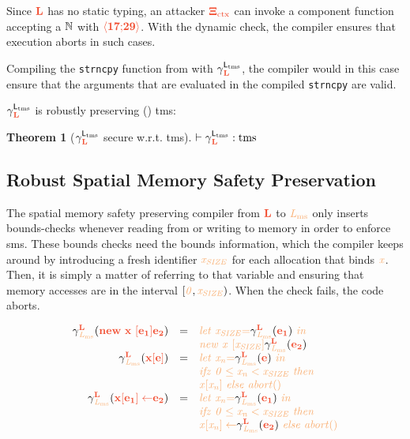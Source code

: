 \documentclass[acmsmall]{acmart}
\theoremstyle{definition}
\newtheorem{theorem}{Theorem}[section]
\begin{document}
\noindent Since $\trg{L}$ has no static typing, an attacker $\trg{\library_{\ctx}}$ can invoke a component function accepting a $\mathsf{\mathbb{N}}$ with $\trg{\lpair{17}{29}}$.
With the dynamic check, the compiler ensures that execution aborts in such cases.

Compiling the \texttt{strncpy} function from  with $\cca$, the compiler would in this case ensure that the arguments that are evaluated in the compiled \texttt{strncpy} are valid.

$\cca$ is robustly preserving () \gls*{tms}:
\begin{theorem}[$\cca$ secure w.r.t. \gls*{tms}]\label{thm:cca:rtp:tms}
    $\rtp{\cca}{\tmssafe}$ %
\end{theorem}

\subsection{Robust Spatial Memory Safety Preservation}\label{subsec:cs:ms}

The spatial memory safety preserving compiler from $\Ltrg$ to $\Lms$ only inserts bounds-checks whenever reading from or writing to memory in order to enforce \gls*{sms}.
These bounds checks need the bounds information, which the compiler keeps around by introducing a fresh identifier $\irl{x_{SIZE}}$ for each allocation that binds $\irl{x}$.
Then, it is simply a matter of referring to that variable and ensuring that memory accesses are in the interval $[\irl{0},\irl{x_{SIZE}})$.
When the check fails, the code aborts.

\begin{nscenter}
  $$
  \begin{array}{rcl}
    \ccb(\trg{\lnew{x}{\expr[_{1}]}{\expr[_{2}]}}) & = 
                                                   & \llet[\irl]{\irl{x_{SIZE}}}{\ccb(\trg{\expr[_{1}]})}{}
    		\\&&
    		\lnew[\irl]{\irl{x}}{\irl{x_{SIZE}}}{\ccb(\trg{\expr[_{2}]})}
    		 \\
  \ccb(\trg{\lget{x}{\expr}}) & = 
                              & \llet[\irl]{\irl{x_{n}}}{\ccb(\trg{\expr})}{}
  	\\&&
  \lifz[\irl]{\irl{0\le x_{n}<x_{SIZE}}}{\\&&\irl{\lget{x}{x_{n}}}}{}
  		\irl{\labort}
  	  \\
  \ccb(\trg{\lset{x}{\expr[_{1}]}{\expr[_{2}]}}) & = 
                                                 & \llet[\irl]{\irl{x_{n}}}{\ccb(\trg{\expr[_{1}]})}{}
  		\\&&
  \lifz[\irl]{\irl{0\le x_{n}<x_{SIZE}}}{\\&&\lset[\irl]{\irl{x}}{\irl{x_{n}}}{}
  		\ccb(\trg{\expr[_{2}]})
  		}{\irl{\labort}} 
  \end{array}
  $$
\end{nscenter}
\end{document}
